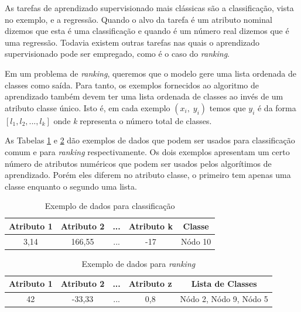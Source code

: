 As tarefas de aprendizado supervisionado mais clássicas são a classificação, vista no exemplo, e a regressão.
Quando o alvo da tarefa é um atributo nominal dizemos que esta é uma classificação e quando é um número real dizemos que é uma regressão.
Todavia existem outras tarefas nas quais o aprendizado supervisionado pode ser empregado, como é o caso do \textit{ranking}.

Em um problema de \textit{ranking}, queremos que o modelo gere uma lista ordenada de classes como saída.
Para tanto, os exemplos fornecidos ao algoritmo de aprendizado também devem ter uma lista ordenada de classes ao invés de um atributo classe único.
Isto é, em cada exemplo $ (x_i,\; y_i) $ temos que $y_i$ é da forma $ [l_1, l_2, ..., l_k] $ onde \textit{k} representa o número total de classes.

As Tabelas \ref{tab:exdados1} e \ref{tab:exdados2} dão exemplos de dados que podem ser usados para classificação comum e para \textit{ranking} respectivamente.
Os dois exemplos apresentam um certo número de atributos numéricos que podem ser usados pelos algorítimos de aprendizado.
Porém eles diferem no atributo classe, o primeiro tem apenas uma classe enquanto o segundo uma lista.

\begin{table}[h!]
  \begin{center}
    \begin{tabular}{ccccc}
      \textbf{Atributo 1} & \textbf{Atributo 2} & ... & \textbf{Atributo k} & \textbf{Classe} \\
      \hline

      3,14 & 166,55 & ... & -17 & Nódo 10 \\

    \end{tabular}
    \caption{Exemplo de dados para classificação}
    \label{tab:exdados1}
  \end{center}
\end{table}

\begin{table}[h!]
  \begin{center}
    \begin{tabular}{ccccc}
      \textbf{Atributo 1} & \textbf{Atributo 2} & ... & \textbf{Atributo z} & \textbf{Lista de Classes} \\
      \hline

      42 & -33,33 & ... & 0,8 & Nódo 2, Nódo 9, Nódo 5 \\

    \end{tabular}
    \caption{Exemplo de dados para \textit{ranking}}
    \label{tab:exdados2}
  \end{center}
\end{table}

